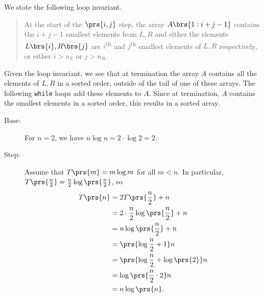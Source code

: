 \documentclass[oneside]{scrbook}
\newcommand{\codeword}[1]{\texttt{#1}}
\theoremstyle{definition}
\begin{document}
\begin{exercise}
    We state the following loop invariant.

    \begin{quote}
        At the start of the $\prs{i,j}$ step, the array $A\brs{1 : i+j-1}$ contains the $i+j-1$ smallest elements from $L,R$ and either the elements $L\brs{i},R\brs{j}$ are $i$\textsuperscript{th} and $j$\textsuperscript{th} smallest elements of $L,R$ respectively, or either $i > n_L$ or $j > n_R$.
    \end{quote}

    Given the loop invariant, we see that at termination the array $A$ contains all the elements of $L,R$ in a sorted order, outside of the tail of one of these arrays. The following \codeword{while} loops add these elements to $A$. Since at termination, $A$ contains the smallest elements in a sorted order, this results in a sorted array.
\end{exercise}

\begin{exercise}
    \begin{description}
        \item[Base:]
            For $n = 2$, we have $n \log n = 2 \cdot \log 2 = 2$.
        \item[Step:]
            Assume that $T\prs{m} = m \log m$ for all $m < n$. In particular, $T\prs{\frac{n}{2}} = \frac{n}{2} \log\prs{\frac{n}{2}}$, so
            \begin{align*}
                T\prs{n} &= 2 T\prs{\frac{n}{2}} + n
                \\&= 2 \cdot \frac{n}{2} \log\prs{\frac{n}{2}} + n
                \\&= n \log \prs{\frac{n}{2}} + n
                \\&= \prs{\log \frac{n}{2} + 1} n
                \\&= \prs{\log \frac{n}{2} + \log\prs{2}} n
                \\&= \log\prs{\frac{n}{2} \cdot 2} n
                \\&= n \log\prs{n} \text{.}
            \end{align*}
    \end{description}
\end{exercise}
\end{document}
